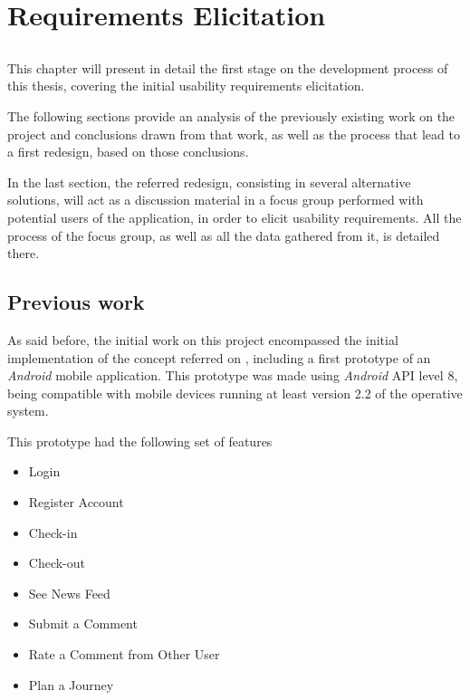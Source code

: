\chapter{Requirements Elicitation}\label{chap:chap4}

\section*{}

This chapter will present in detail the first stage on the development process of this thesis, covering the initial usability requirements elicitation.

The following sections provide an analysis of the previously existing work on the project and conclusions drawn from that work, as well as the process that lead to a first redesign, based on those conclusions.

In the last section, the referred redesign, consisting in several alternative solutions, will act as a discussion material in a focus group performed with potential users of the application, in order to elicit usability requirements. All the process of the focus group, as well as all the data gathered from it, is detailed there.

\section{Previous work}

As said before, the initial work on this project encompassed the initial implementation of the concept referred on \cite{kn:NGeCP11}, including a first prototype of an \emph{Android} mobile application. This prototype was made using \emph{Android} API level 8, being compatible with mobile devices running at least version 2.2 of the operative system.

This prototype had the following set of features \cite{kn:eSG12}

\begin{itemize}
\item Login
\item Register Account
\item Check-in
\item Check-out
\item See News Feed
\item Submit a Comment
\item Rate a Comment from Other User
\item Plan a Journey
\end{itemize}

